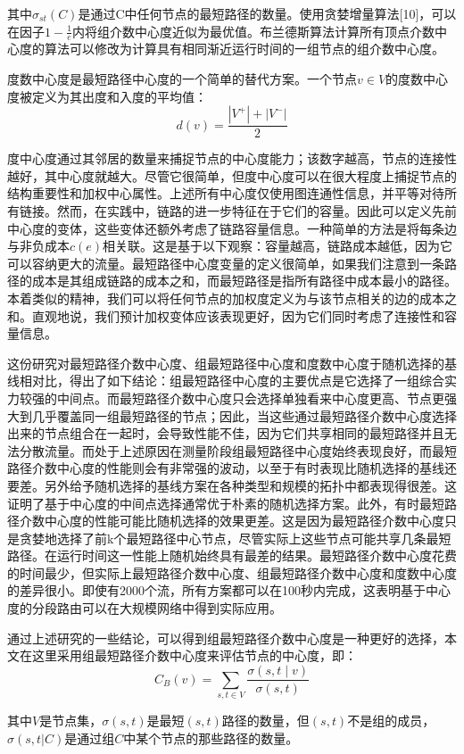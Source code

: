 其中$\sigma_{st}\left(C\right)$是通过C中任何节点的最短路径的数量。使用贪婪增量算法[10]，可以在因子$1-\frac{1}{e}$内将组介数中心度近似为最优值。布兰德斯算法计算所有顶点介数中心度的算法可以修改为计算具有相同渐近运行时间的一组节点的组介数中心度。

度数中心度是最短路径中心度的一个简单的替代方案。一个节点$v \in V$的度数中心度被定义为其出度和入度的平均值：
$$d(v)=\frac{|V^+|+|V^-|}{2}$$

度中心度通过其邻居的数量来捕捉节点的中心度能力；该数字越高，节点的连接性越好，其中心度就越大。尽管它很简单，但度中心度可以在很大程度上捕捉节点的结构重要性和加权中心属性。上述所有中心度仅使用图连通性信息，并平等对待所有链接。然而，在实践中，链路的进一步特征在于它们的容量。因此可以定义先前中心度的变体，这些变体还额外考虑了链路容量信息。一种简单的方法是将每条边与非负成本$c(e)$相关联。这是基于以下观察：容量越高，链路成本越低，因为它可以容纳更大的流量。最短路径中心度变量的定义很简单，如果我们注意到一条路径的成本是其组成链路的成本之和，而最短路径是指所有路径中成本最小的路径。本着类似的精神，我们可以将任何节点的加权度定义为与该节点相关的边的成本之和。直观地说，我们预计加权变体应该表现更好，因为它们同时考虑了连接性和容量信息。

这份研究对最短路径介数中心度、组最短路径中心度和度数中心度于随机选择的基线相对比，得出了如下结论：组最短路径中心度的主要优点是它选择了一组综合实力较强的中间点。而最短路径介数中心度只会选择单独看来中心度更高、节点更强大到几乎覆盖同一组最短路径的节点；因此，当这些通过最短路径介数中心度选择出来的节点组合在一起时，会导致性能不佳，因为它们共享相同的最短路径并且无法分散流量。而处于上述原因在测量阶段组最短路径中心度始终表现良好，而最短路径介数中心度的性能则会有非常强的波动，以至于有时表现比随机选择的基线还要差。另外给予随机选择的基线方案在各种类型和规模的拓扑中都表现得很差。这证明了基于中心度的中间点选择通常优于朴素的随机选择方案。此外，有时最短路径介数中心度的性能可能比随机选择的效果更差。这是因为最短路径介数中心度只是贪婪地选择了前k个最短路径中心节点，尽管实际上这些节点可能共享几条最短路径。在运行时间这一性能上随机始终具有最差的结果。最短路径介数中心度花费的时间最少，但实际上最短路径介数中心度、组最短路径介数中心度和度数中心度的差异很小。即使有2000个流，所有方案都可以在100秒内完成，这表明基于中心度的分段路由可以在大规模网络中得到实际应用。

通过上述研究的一些结论，可以得到组最短路径介数中心度是一种更好的选择，本文在这里采用组最短路径介数中心度来评估节点的中心度，即：
$$C_B\left(v\right)=\sum_{s,t\in V}\frac{\sigma\left(s,t\middle| v\right)}{\sigma(s,t)}$$

其中$V$是节点集，$\sigma\left(s,t\right)$是最短$\left(s,t\right)$路径的数量，但$\left(s,t\right)$不是组的成员，$\sigma(s,t|C)$是通过组$C$中某个节点的那些路径的数量。

